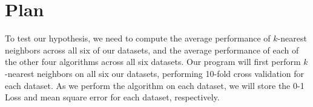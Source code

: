 \documentclass{article}
\begin{document}
\section{Plan}
To test our hypothesis, we need to compute the average performance of $k$-nearest neighbors across all six of our datasets, and the average performance of each of the other four algorithms across all six datasets. Our program will first perform $k$-nearest neighbors on all six our datasets, performing 10-fold cross validation for each dataset. As we perform the algorithm on each dataset, we will store the 0-1 Loss and mean square error for each dataset, respectively.
\end{document}

